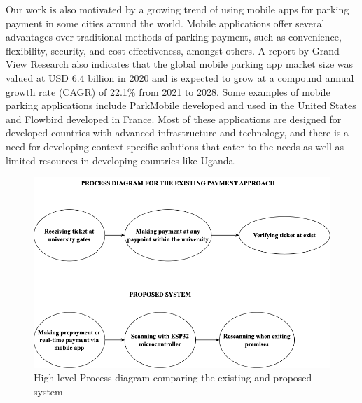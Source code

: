 Our work is also motivated by a growing trend of using mobile apps for parking payment in some cities around the world. Mobile applications offer several advantages over traditional methods of parking payment, such as convenience, flexibility, security, and cost-effectiveness, amongst others. A report by Grand View Research also indicates that the global mobile parking app market size was valued at USD 6.4 billion in 2020 and is expected to grow at a compound annual growth rate (CAGR) of 22.1\% from 2021 to 2028\cite{GrandViewResearch2023}. Some examples of mobile parking applications include ParkMobile\cite{ParkMobile2023} developed and used in the United States and Flowbird developed in France\cite{Flowbird2023}. Most of these applications are designed for developed countries with advanced infrastructure and technology, and there is a need for developing context-specific solutions that cater to the needs as well as limited resources in developing countries like Uganda.


\begin{figure}[h]
    \begin{center}
        \includegraphics[scale = 0.4]{images/process}
        \caption{High level Process diagram comparing the existing and proposed system}
    \end{center}
\end{figure}


\clearpage